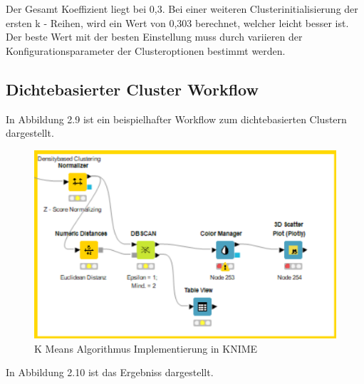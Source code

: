 \documentclass[12pt,					%
							 oneside,			%
							 a4paper,			%
							 halfparskip,		%
							 liststotoc,			%
							 bibtotoc,			%
							 fleqn,				%
							 pointlessnumbers]	%
							 {scrreprt}
\begin{document}
		Der Gesamt Koeffizient liegt bei 0,3. Bei einer weiteren Clusterinitialisierung der ersten k - Reihen, wird ein Wert von 0,303 berechnet, welcher leicht besser ist. Der beste Wert mit der besten Einstellung muss durch variieren der Konfigurationsparameter der Clusteroptionen bestimmt werden. 
		\subsection{Dichtebasierter Cluster Workflow}
		In Abbildung 2.9 ist ein beispielhafter Workflow zum dichtebasierten Clustern dargestellt.
		
		\begin{figure}[!h]
			\begin{center}
				\includegraphics[scale=1]{pictures/dichte.png}
				\caption{K Means Algorithmus Implementierung in KNIME}
			\end{center}
		\end{figure}
		
		In Abbildung 2.10 ist das Ergebniss dargestellt. 
		
\end{document}
